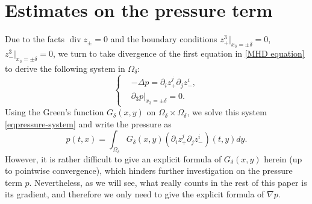 \documentclass[10pt,reqno]{amsart}
\numberwithin{equation}{section}
\begin{document}
\section{Estimates on the pressure term}\label{sec:pressure}
Due to the facts $\operatorname{div} z_\pm=0$ and the boundary conditions $z_+^3|_{x_3=\pm\delta}=0$, $z_-^3|_{x_3=\pm\delta}=0$, we turn to
take divergence of the first equation in \eqref{MHD equation} to derive the following system in 
$\Omega_\delta$:
\begin{equation}\label{eqpressure-system}
	\begin{cases}
		&-\Delta p=\partial_iz_+^j\partial_jz_-^i,\\
		&\partial_3p\big|_{x_3=\pm\delta}=0.
	\end{cases}
\end{equation}
Using the Green's function $G_\delta(x,y)$ on $\Omega_\delta\times\Omega_\delta$, we 
solve this system \eqref{eqpressure-system} and write the pressure as
\begin{equation}\label{eqpressure-formula}
	 p(t,x)=\int_{\Omega_\delta}  G_\delta(x,y)(\partial_iz_+^j\partial_jz_-^i)(t,y)dy.
\end{equation} 
However, it is rather difficult to give an explicit formula of $G_\delta(x,y)$ herein (up to pointwise convergence), which hinders further investigation on the pressure term $p$. Nevertheless, as we will see, what really counts in the rest of this paper is its gradient, and therefore we only need to give the explicit formula of $\nabla p$. 
\end{document}
